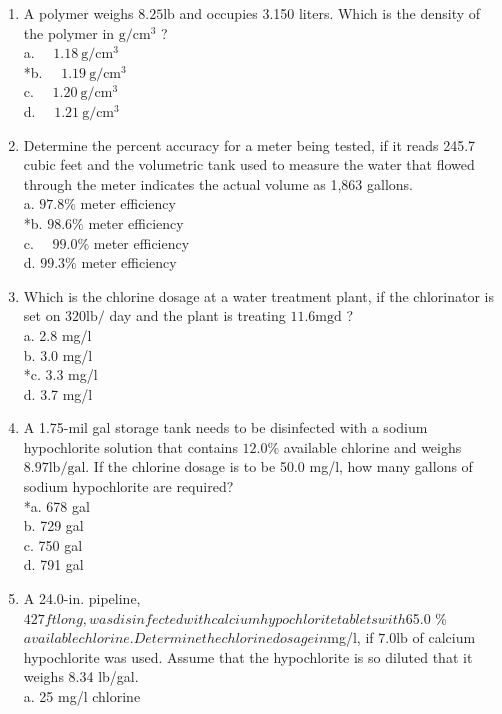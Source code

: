 \begin{enumerate}
\item A polymer weighs $8.25 \mathrm{lb}$ and occupies 3.150 liters. Which is the density of the polymer in $\mathrm{g} / \mathrm{cm}^{3}$ ?\\
a. $\quad 1.18 \mathrm{~g} / \mathrm{cm}^{3}$\\
*b. $\quad 1.19 \mathrm{~g} / \mathrm{cm}^{3}$\\
c. $\quad 1.20 \mathrm{~g} / \mathrm{cm}^{3}$\\
d. $\quad 1.21 \mathrm{~g} / \mathrm{cm}^{3}$\\
\item Determine the percent accuracy for a meter being tested, if it reads 245.7 cubic feet and the volumetric tank used to measure the water that flowed through the meter indicates the actual volume as 1,863 gallons.\\
a. $97.8 \%$ meter efficiency\\
*b. $98.6 \%$ meter efficiency\\
c. $\quad 99.0 \%$ meter efficiency\\
d. $99.3 \%$ meter efficiency\\
\item Which is the chlorine dosage at a water treatment plant, if the chlorinator is set on $320 \mathrm{lb} /$ day and the plant is treating $11.6 \mathrm{mgd}$ ?\\
a. 2.8 mg/l\\
b. 3.0 mg/l\\
*c. 3.3 mg/l\\
d. 3.7 mg/l\\
\item A 1.75-mil gal storage tank needs to be disinfected with a sodium hypochlorite solution that contains $12.0 \%$ available chlorine and weighs $8.97 \mathrm{lb} / \mathrm{gal}$. If the chlorine dosage is to be 50.0 mg/l, how many gallons of sodium hypochlorite are required?\\
*a. 678 gal\\
b. 729 gal\\
c. 750 gal\\
d. 791 gal\\
\item A 24.0-in. pipeline, $427 ft long, was disinfected with calcium hypochlorite tablets with $65.0 \%$ available chlorine. Determine the chlorine dosage in $mg/l, if $7.0 \mathrm{lb}$ of calcium hypochlorite was used. Assume that the hypochlorite is so diluted that it weighs 8.34 lb/gal.\\
a. 25 mg/l chlorine\\

\end{enumerate}
